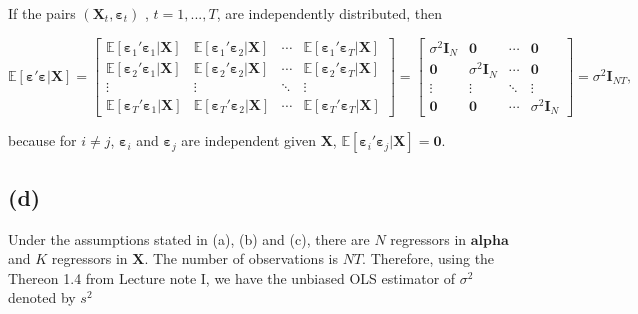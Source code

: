 \documentclass[
]{article}
\begin{document}
If the pairs \((\boldsymbol{X}_t,\boldsymbol{\varepsilon}_t)\) ,
\(t=1,...,T\), are independently distributed, then

\[\mathbb{E}[\boldsymbol{\varepsilon}'\boldsymbol{\varepsilon}|\boldsymbol{X}] = \begin{bmatrix}\mathbb{E}[\boldsymbol{\varepsilon}_1'\boldsymbol{\varepsilon}_1|\boldsymbol{X}] & \mathbb{E}[\boldsymbol{\varepsilon}_1'\boldsymbol{\varepsilon}_2|\boldsymbol{X}] & \cdots & \mathbb{E}[\boldsymbol{\varepsilon}_1'\boldsymbol{\varepsilon}_T|\boldsymbol{X}] \\ \mathbb{E}[\boldsymbol{\varepsilon}_2'\boldsymbol{\varepsilon}_1|\boldsymbol{X}] & \mathbb{E}[\boldsymbol{\varepsilon}_2'\boldsymbol{\varepsilon}_2|\boldsymbol{X}] & \cdots & \mathbb{E}[\boldsymbol{\varepsilon}_2'\boldsymbol{\varepsilon}_T|\boldsymbol{X}] \\ \vdots & \vdots & \ddots & \vdots \\ \mathbb{E}[\boldsymbol{\varepsilon}_T'\boldsymbol{\varepsilon}_1|\boldsymbol{X}] & \mathbb{E}[\boldsymbol{\varepsilon}_T'\boldsymbol{\varepsilon}_2|\boldsymbol{X}] & \cdots & \mathbb{E}[\boldsymbol{\varepsilon}_T'\boldsymbol{\varepsilon}_T|\boldsymbol{X}]\end{bmatrix} = \begin{bmatrix}\sigma^2\boldsymbol{I}_N & \boldsymbol{0} & \cdots & \boldsymbol{0} \\ \boldsymbol{0} & \sigma^2\boldsymbol{I}_N & \cdots & \boldsymbol{0}\\ \vdots & \vdots & \ddots & \vdots \\ \boldsymbol{0} & \boldsymbol{0} & \cdots & \sigma^2\boldsymbol{I}_N\end{bmatrix}=\sigma^2\boldsymbol{I}_{NT},\]

because for \(i \neq j\), \(\boldsymbol{\varepsilon}_i\) and
\(\boldsymbol{\varepsilon}_j\) are independent given \(\boldsymbol{X}\),
\(\mathbb{E}[\boldsymbol{\varepsilon}_i'\boldsymbol{\varepsilon}_j|\boldsymbol{X}] = \boldsymbol{0}\).

\hypertarget{d}{%
\subsection{(d)}\label{d}}

Under the assumptions stated in (a), (b) and (c), there are \(N\)
regressors in \(\boldsymbol{alpha}\) and \(K\) regressors in
\(\boldsymbol{X}\). The number of observations is \(NT\). Therefore,
using the Thereon 1.4 from Lecture note I, we have the unbiased OLS
estimator of \(\sigma^2\) denoted by \(s^2\)
\end{document}
